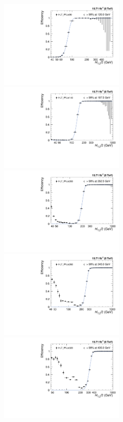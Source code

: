 \begin{figure}[!htbp]
 \begin{center}
 \includegraphics[width=0.53\textwidth]{Plots_HT_2_150/Fit_Turn_Efficiency_80_2_ht_2.pdf}%
 ~~\includegraphics[width=0.53\textwidth]{Plots_HT_2_150/Fit_Turn_Efficiency_140_2_ht_2.pdf}\\
 \includegraphics[width=0.53\textwidth]{Plots_HT_2_150/Fit_Turn_Efficiency_200_2_ht_2.pdf}%
 ~~\includegraphics[width=0.53\textwidth]{Plots_HT_2_150/Fit_Turn_Efficiency_260_2_ht_2.pdf}\\
 \includegraphics[width=0.53\textwidth]{Plots_HT_2_150/Fit_Turn_Efficiency_320_2_ht_2.pdf}%

\end{center}
\end{figure}
